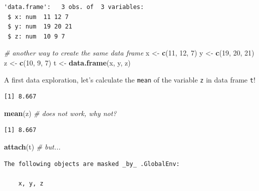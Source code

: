 \documentclass[
]{book}
\newenvironment{Shaded}{\begin{snugshade}}{\end{snugshade}}
\newcommand{\CommentTok}[1]{\textcolor[rgb]{0.56,0.35,0.01}{\textit{#1}}}
\newcommand{\DecValTok}[1]{\textcolor[rgb]{0.00,0.00,0.81}{#1}}
\newcommand{\KeywordTok}[1]{\textcolor[rgb]{0.13,0.29,0.53}{\textbf{#1}}}
\newcommand{\NormalTok}[1]{#1}
\newcommand{\OperatorTok}[1]{\textcolor[rgb]{0.81,0.36,0.00}{\textbf{#1}}}
\newcommand{\StringTok}[1]{\textcolor[rgb]{0.31,0.60,0.02}{#1}}
\begin{document}
\begin{verbatim}
'data.frame':	3 obs. of  3 variables:
 $ x: num  11 12 7
 $ y: num  19 20 21
 $ z: num  10 9 7
\end{verbatim}

\begin{Shaded}
\begin{Highlighting}[]
\CommentTok{# another way to create the same data frame}
\NormalTok{x <-}\StringTok{ }\KeywordTok{c}\NormalTok{(}\DecValTok{11}\NormalTok{, }\DecValTok{12}\NormalTok{, }\DecValTok{7}\NormalTok{)}
\NormalTok{y <-}\StringTok{ }\KeywordTok{c}\NormalTok{(}\DecValTok{19}\NormalTok{, }\DecValTok{20}\NormalTok{, }\DecValTok{21}\NormalTok{)}
\NormalTok{z <-}\StringTok{ }\KeywordTok{c}\NormalTok{(}\DecValTok{10}\NormalTok{, }\DecValTok{9}\NormalTok{, }\DecValTok{7}\NormalTok{)}
\NormalTok{t <-}\StringTok{ }\KeywordTok{data.frame}\NormalTok{(x, y, z)}
\end{Highlighting}
\end{Shaded}

A first data exploration, let's calculate the \texttt{mean} of the variable \texttt{z} in data frame \texttt{t}!

\begin{Shaded}
\end{Shaded}

\begin{verbatim}
[1] 8.667
\end{verbatim}

\begin{Shaded}
\begin{Highlighting}[]
\KeywordTok{mean}\NormalTok{(z)   }\CommentTok{# does not work, why not?}
\end{Highlighting}
\end{Shaded}

\begin{verbatim}
[1] 8.667
\end{verbatim}

\begin{Shaded}
\begin{Highlighting}[]
\KeywordTok{attach}\NormalTok{(t) }\CommentTok{# but...}
\end{Highlighting}
\end{Shaded}

\begin{verbatim}
The following objects are masked _by_ .GlobalEnv:

    x, y, z
\end{verbatim}
\end{document}
